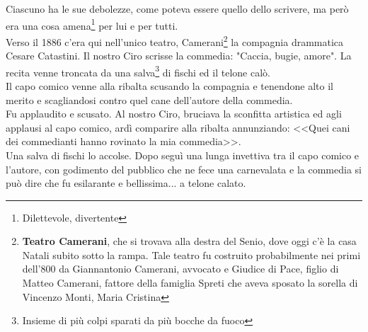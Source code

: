 Ciascuno ha le sue debolezze, come poteva essere quello dello scrivere, ma però era una cosa amena\footnote{Dilettevole, divertente} per lui e per tutti. \\
\indent Verso il 1886 c'era qui nell'unico teatro, Camerani\footnote{\textbf{Teatro Camerani}, che si trovava alla destra del Senio, dove oggi c'è la casa Natali subito sotto la rampa. Tale teatro fu costruito probabilmente nei primi dell'800 da Giannantonio Camerani, avvocato e Giudice di Pace, figlio di Matteo Camerani, fattore della famiglia Spreti che aveva sposato la sorella di Vincenzo Monti, Maria Cristina} la compagnia drammatica Cesare Catastini. Il nostro Ciro scrisse la commedia: "Caccia, bugie, amore". La recita venne troncata da una salva\footnote{Insieme di più colpi sparati da più bocche da fuoco} di fischi ed il telone calò.\\
\indent Il capo comico venne alla ribalta scusando la compagnia e tenendone alto il merito e scagliandosi contro quel cane dell'autore della commedia.\\
\indent Fu applaudito e scusato. Al nostro Ciro, bruciava la sconfitta artistica ed agli applausi al capo comico, ardì comparire alla ribalta annunziando: <<Quei cani dei commedianti hanno rovinato la mia commedia>>.\\
\indent Una salva di fischi lo accolse. Dopo seguì una lunga invettiva tra il capo comico e l'autore, con godimento del pubblico che ne fece una carnevalata e la commedia si può dire che fu esilarante e bellissima... a telone calato. 

